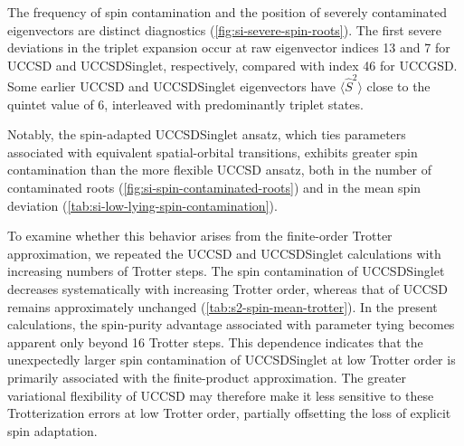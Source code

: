 The frequency of spin contamination and the position of severely contaminated eigenvectors are distinct diagnostics (\cref{fig:si-severe-spin-roots}). 
The first severe deviations in the triplet expansion occur at raw eigenvector indices 13 and 7 for UCCSD and UCCSDSinglet, respectively, compared with index 46 for UCCGSD. 
Some earlier UCCSD and UCCSDSinglet eigenvectors have $\langle \hat S^2\rangle$ close to the quintet value of 6, interleaved with predominantly triplet states. 




Notably, the spin-adapted UCCSDSinglet ansatz, which ties parameters associated with equivalent spatial-orbital transitions, exhibits greater spin contamination than the more flexible UCCSD ansatz, both in the number of contaminated roots (\cref{fig:si-spin-contaminated-roots}) and in the mean spin deviation (\cref{tab:si-low-lying-spin-contamination}). 


To examine whether this behavior arises from the finite-order Trotter approximation, we repeated the UCCSD and UCCSDSinglet calculations with increasing numbers of Trotter steps. 
The spin contamination of UCCSDSinglet decreases systematically with increasing Trotter order, whereas that of UCCSD remains approximately unchanged (\cref{tab:s2-spin-mean-trotter}). 
In the present calculations, the spin-purity advantage associated with parameter tying becomes apparent only beyond 16 Trotter steps. 
This dependence indicates that the unexpectedly larger spin contamination of UCCSDSinglet at low Trotter order is primarily associated with the finite-product approximation. 
The greater variational flexibility of UCCSD may therefore make it less sensitive to these Trotterization errors at low Trotter order, partially offsetting the loss of explicit spin adaptation.
